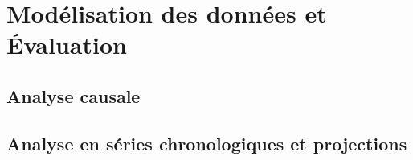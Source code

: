 \chapter{Modélisation des données et Évaluation}

\cleardoublepage

	\section{Analyse causale}
	\section{Analyse en séries chronologiques et projections}